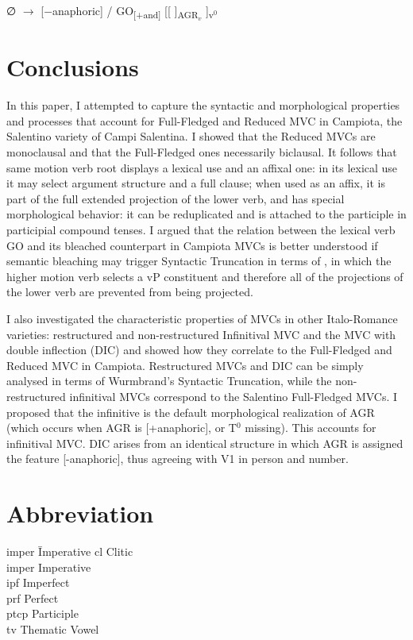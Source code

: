 \documentclass[output=paper]{langscibook}
\begin{document}
\ea \label{ac101}∅ $\rightarrow$ [−anaphoric] /  GO\textsubscript{[+and]} [[ \underline{\hspace{3em}} ]\textsubscript{AGR$_v$} ]\textsubscript{v$^0$}
\z

\section{Conclusions}

In this paper, I attempted to capture the syntactic and morphological properties and processes that account for Full-Fledged and Reduced MVC in Campiota, the Salentino variety of Campi Salentina. I showed that the Reduced MVCs are monoclausal and that the Full-Fledged ones necessarily biclausal. It follows that same motion verb root displays a lexical use and an affixal one:  in its lexical use it may select argument structure and a full clause; when used as an affix, it is part of the full extended projection of the lower verb, and has special morphological behavior: it can be reduplicated and is attached to the participle in participial compound tenses. I argued that the relation between the lexical verb GO and its bleached counterpart in Campiota MVCs is better understood if semantic bleaching may trigger Syntactic Truncation  in terms of \citet{wurmbrand2014a, wurmbrand2015, wurmbrand2017verb}, in which the higher motion verb selects a vP constituent and therefore all of the projections of the lower verb are prevented from being projected.

I also investigated the characteristic properties of MVCs in other Italo-Ro\-mance varieties: restructured and non-restructured Infinitival MVC and the MVC with double inflection (DIC) and showed how they correlate to the Full-Fledged and Reduced MVC in Campiota.  Restructured MVCs and DIC can be simply analysed in terms of Wurmbrand's Syntactic Truncation, while the non-restructured infinitival MVCs correspond to the Salentino Full-Fledged MVCs.  I proposed that the infinitive is the default morphological realization of AGR (which occurs when AGR is [+anaphoric], or T$^0$ missing).  This accounts for infinitival MVC.  DIC arises from an identical structure in which AGR is assigned the feature [-anaphoric], thus agreeing with V1 in person and number.

\section*{Abbreviation}
\begin{multicols}{2}
\begin{tabbing}
{\sc imper}\hspace{.5ex} \= Imperative \kill
{\sc cl} \> Clitic \\
{\sc imper} \> Imperative \\
{\sc ipf} \> Imperfect\\
{\sc prf} \> Perfect\\
{\sc ptcp} \> Participle\\
{\sc tv} \> Thematic Vowel
\end{tabbing}
\end{multicols}
\end{document}
